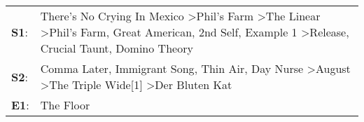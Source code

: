 \begin{supertabular}{p{0.03\textwidth}p{0.92\textwidth}}
 \textbf{S1}:  &  There's No Crying In Mexico\textsuperscript{} \textgreater \enspace Phil's Farm\textsuperscript{} \textgreater \enspace The Linear\textsuperscript{} \textgreater \enspace Phil's Farm\textsuperscript{}, \enspace Great American\textsuperscript{}, \enspace 2nd Self\textsuperscript{}, \enspace Example 1\textsuperscript{} \textgreater \enspace Release\textsuperscript{}, \enspace Crucial Taunt\textsuperscript{}, \enspace Domino Theory\textsuperscript{}  \enspace  \\
 \textbf{S2}:  &                                                                                                                                                Comma Later\textsuperscript{}, \enspace Immigrant Song\textsuperscript{}, \enspace Thin Air\textsuperscript{}, \enspace Day Nurse\textsuperscript{} \textgreater \enspace August\textsuperscript{} \textgreater \enspace The Triple Wide[1]\textsuperscript{} \textgreater \enspace Der Bluten Kat\textsuperscript{}  \enspace  \\
 \textbf{E1}:  &                                                                                                                                                                                                                                                                                                                                                                                                                                         The Floor\textsuperscript{}  \enspace  \\
\end{supertabular}
